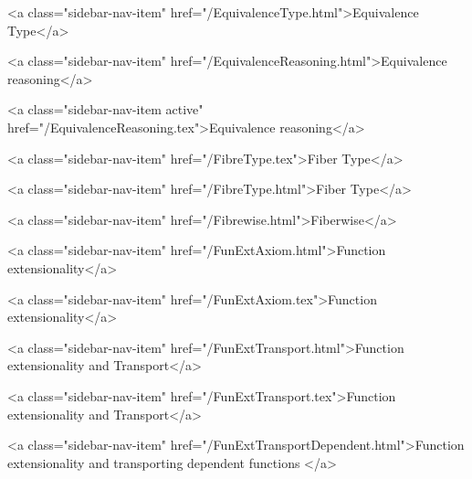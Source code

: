       
    
      
        
          <a class="sidebar-nav-item" href="/EquivalenceType.html">Equivalence Type</a>
        
      
    
      
        
          <a class="sidebar-nav-item" href="/EquivalenceReasoning.html">Equivalence reasoning</a>
        
      
    
      
        
          <a class="sidebar-nav-item active" href="/EquivalenceReasoning.tex">Equivalence reasoning</a>
        
      
    
      
        
          <a class="sidebar-nav-item" href="/FibreType.tex">Fiber Type</a>
        
      
    
      
        
          <a class="sidebar-nav-item" href="/FibreType.html">Fiber Type</a>
        
      
    
      
        
          <a class="sidebar-nav-item" href="/Fibrewise.html">Fiberwise</a>
        
      
    
      
        
          <a class="sidebar-nav-item" href="/FunExtAxiom.html">Function extensionality</a>
        
      
    
      
        
          <a class="sidebar-nav-item" href="/FunExtAxiom.tex">Function extensionality</a>
        
      
    
      
        
          <a class="sidebar-nav-item" href="/FunExtTransport.html">Function extensionality and Transport</a>
        
      
    
      
        
          <a class="sidebar-nav-item" href="/FunExtTransport.tex">Function extensionality and Transport</a>
        
      
    
      
        
          <a class="sidebar-nav-item" href="/FunExtTransportDependent.html">Function extensionality and transporting dependent functions </a>
        
